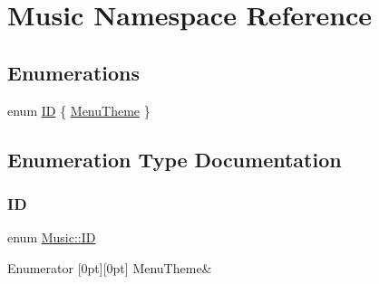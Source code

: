 \hypertarget{namespace_music}{}\section{Music Namespace Reference}
\label{namespace_music}
\subsection*{Enumerations}
\begin{DoxyCompactItemize}
\item 
enum \hyperlink{namespace_music_ad5e0c8c2e2e7bdcbffbb125051531b86}{ID} \{ \hyperlink{namespace_music_ad5e0c8c2e2e7bdcbffbb125051531b86a6bcadfc9c1f05aec18efb26a7bec3bc0}{Menu\+Theme}
 \}
\end{DoxyCompactItemize}


\subsection{Enumeration Type Documentation}
\mbox{\label{namespace_music_ad5e0c8c2e2e7bdcbffbb125051531b86}} 
\subsubsection{\texorpdfstring{ID}{ID}}
{\footnotesize\ttfamily enum \hyperlink{namespace_music_ad5e0c8c2e2e7bdcbffbb125051531b86}{Music\+::\+ID}}

\begin{DoxyEnumFields}{Enumerator}
[0pt][0pt]{}\mbox{\label{namespace_music_ad5e0c8c2e2e7bdcbffbb125051531b86a6bcadfc9c1f05aec18efb26a7bec3bc0}} 
Menu\+Theme&\\
\hline

\end{DoxyEnumFields}
